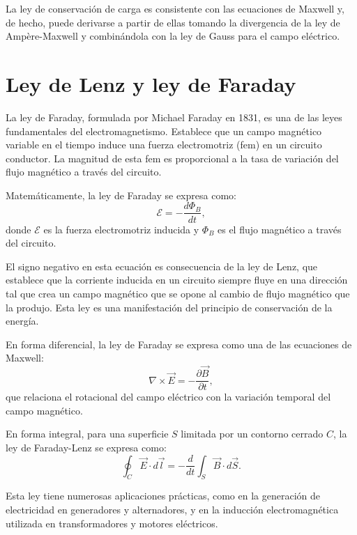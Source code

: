\documentclass[12pt,a4paper]{book}
\begin{document}
La ley de conservación de carga es consistente con las ecuaciones de Maxwell y, de hecho, puede derivarse a partir de ellas tomando la divergencia de la ley de Ampère-Maxwell y combinándola con la ley de Gauss para el campo eléctrico.

\section{Ley de Lenz y ley de Faraday}

La ley de Faraday, formulada por Michael Faraday en 1831, es una de las leyes fundamentales del electromagnetismo. Establece que un campo magnético variable en el tiempo induce una fuerza electromotriz (fem) en un circuito conductor. La magnitud de esta fem es proporcional a la tasa de variación del flujo magnético a través del circuito.

Matemáticamente, la ley de Faraday se expresa como:
\begin{equation}
\mathcal{E} = -\frac{d\Phi_B}{dt},
\end{equation}
donde $\mathcal{E}$ es la fuerza electromotriz inducida y $\Phi_B$ es el flujo magnético a través del circuito.

El signo negativo en esta ecuación es consecuencia de la ley de Lenz, que establece que la corriente inducida en un circuito siempre fluye en una dirección tal que crea un campo magnético que se opone al cambio de flujo magnético que la produjo. Esta ley es una manifestación del principio de conservación de la energía.

En forma diferencial, la ley de Faraday se expresa como una de las ecuaciones de Maxwell:
\begin{equation}
\nabla \times \vec{E} = -\frac{\partial \vec{B}}{\partial t},
\end{equation}
que relaciona el rotacional del campo eléctrico con la variación temporal del campo magnético.

En forma integral, para una superficie $S$ limitada por un contorno cerrado $C$, la ley de Faraday-Lenz se expresa como:
\begin{equation}
\oint_C \vec{E} \cdot d\vec{l} = -\frac{d}{dt} \int_S \vec{B} \cdot d\vec{S}.
\end{equation}

Esta ley tiene numerosas aplicaciones prácticas, como en la generación de electricidad en generadores y alternadores, y en la inducción electromagnética utilizada en transformadores y motores eléctricos.
\end{document}
